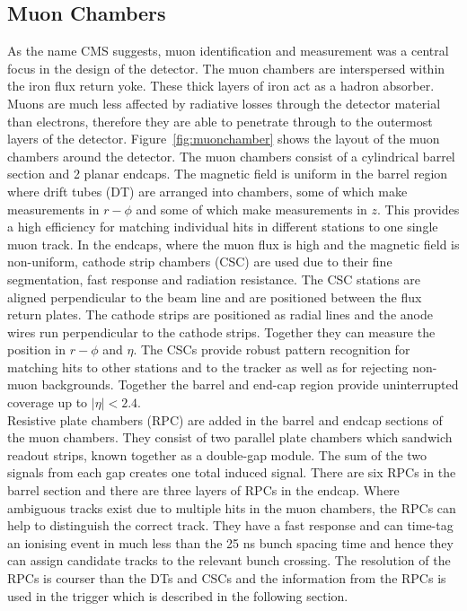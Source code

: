 \subsection{Muon Chambers}
As the name CMS suggests, muon identification and measurement was a central focus in the design of the detector. The muon chambers are interspersed within the iron flux return yoke. These thick layers of iron act as a hadron absorber. Muons are much less affected by radiative losses through the detector material than electrons, therefore they are able to penetrate through to the outermost layers of the detector. Figure~\ref{fig:muonchamber} shows the layout of the muon chambers around the detector. The muon chambers consist of a cylindrical barrel section and 2 planar endcaps. The magnetic field is uniform in the barrel region where drift tubes (DT) are arranged into chambers, some of which make measurements in $r-\phi$ and some of which make measurements in $z$. This provides a high efficiency for matching individual hits in different stations to one single muon track.
In the endcaps, where the muon flux is high and the magnetic field is non-uniform, cathode strip chambers (CSC) are used due to their fine segmentation, fast response and radiation resistance. The CSC stations are aligned perpendicular to the beam line and are positioned between the flux return plates. The cathode strips are positioned as radial lines and the anode wires run perpendicular to the cathode strips. Together they can measure the position in $r-\phi$ and $\eta$. The CSCs provide robust pattern recognition for matching hits to other stations and to the tracker as well as for rejecting non-muon backgrounds. 
Together the barrel and end-cap region provide uninterrupted coverage up to $|\eta|<2.4$.\\
Resistive plate chambers (RPC) are added in the barrel and endcap sections of the muon chambers. They consist of two parallel plate chambers which sandwich readout strips, known together as a double-gap module. The sum of the two signals from each gap creates one total induced signal. There are six RPCs in the barrel section and there are three layers of RPCs in the endcap.
Where ambiguous tracks exist due to multiple hits in the muon chambers, the RPCs can help to distinguish the correct track. They have a fast response and can time-tag an ionising event in much less than the 25 ns bunch spacing time and hence they can assign candidate tracks to the relevant bunch crossing. The resolution of the RPCs is courser than the DTs and CSCs and the information from the RPCs is used in the trigger which is described in the following section.

